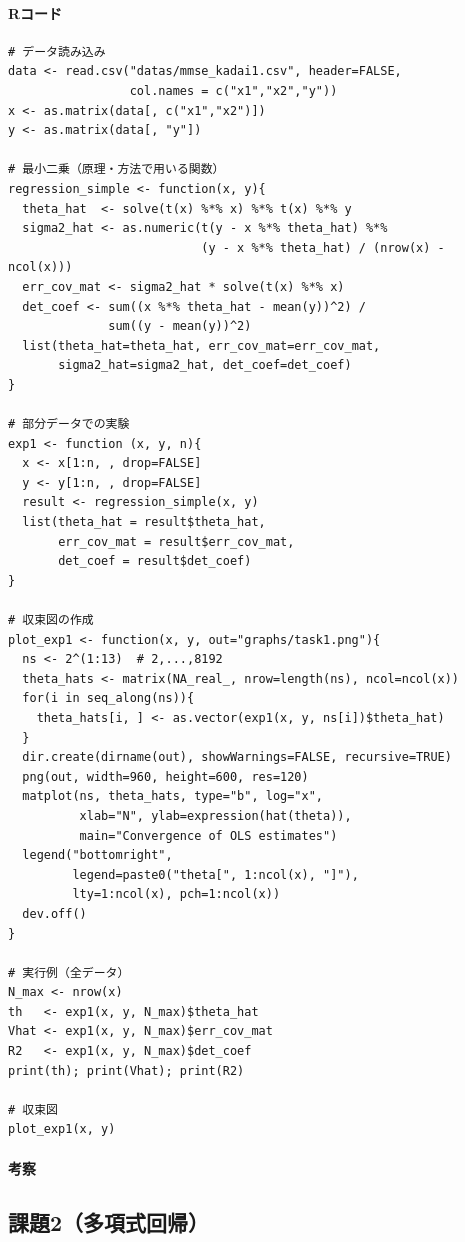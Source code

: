 \paragraph{Rコード}
\begin{verbatim}
# データ読み込み
data <- read.csv("datas/mmse_kadai1.csv", header=FALSE,
                 col.names = c("x1","x2","y"))
x <- as.matrix(data[, c("x1","x2")])
y <- as.matrix(data[, "y"])

# 最小二乗（原理・方法で用いる関数）
regression_simple <- function(x, y){
  theta_hat  <- solve(t(x) %*% x) %*% t(x) %*% y
  sigma2_hat <- as.numeric(t(y - x %*% theta_hat) %*%
                           (y - x %*% theta_hat) / (nrow(x) - ncol(x)))
  err_cov_mat <- sigma2_hat * solve(t(x) %*% x)
  det_coef <- sum((x %*% theta_hat - mean(y))^2) /
              sum((y - mean(y))^2)
  list(theta_hat=theta_hat, err_cov_mat=err_cov_mat,
       sigma2_hat=sigma2_hat, det_coef=det_coef)
}

# 部分データでの実験
exp1 <- function (x, y, n){
  x <- x[1:n, , drop=FALSE]
  y <- y[1:n, , drop=FALSE]
  result <- regression_simple(x, y)
  list(theta_hat = result$theta_hat,
       err_cov_mat = result$err_cov_mat,
       det_coef = result$det_coef)
}

# 収束図の作成
plot_exp1 <- function(x, y, out="graphs/task1.png"){
  ns <- 2^(1:13)  # 2,...,8192
  theta_hats <- matrix(NA_real_, nrow=length(ns), ncol=ncol(x))
  for(i in seq_along(ns)){
    theta_hats[i, ] <- as.vector(exp1(x, y, ns[i])$theta_hat)
  }
  dir.create(dirname(out), showWarnings=FALSE, recursive=TRUE)
  png(out, width=960, height=600, res=120)
  matplot(ns, theta_hats, type="b", log="x",
          xlab="N", ylab=expression(hat(theta)),
          main="Convergence of OLS estimates")
  legend("bottomright",
         legend=paste0("theta[", 1:ncol(x), "]"),
         lty=1:ncol(x), pch=1:ncol(x))
  dev.off()
}

# 実行例（全データ）
N_max <- nrow(x)
th   <- exp1(x, y, N_max)$theta_hat
Vhat <- exp1(x, y, N_max)$err_cov_mat
R2   <- exp1(x, y, N_max)$det_coef
print(th); print(Vhat); print(R2)

# 収束図
plot_exp1(x, y)
\end{verbatim}

\paragraph {考察}


\subsection{課題2（多項式回帰）}

